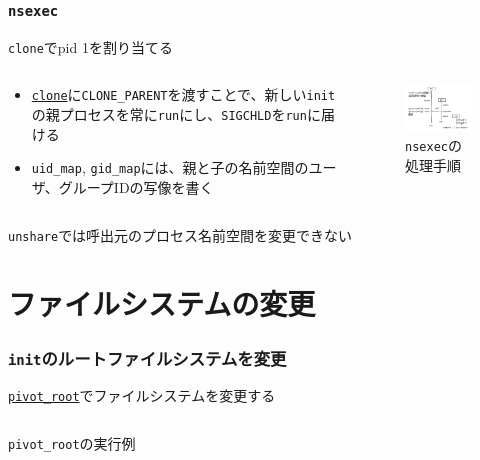 \documentclass[unicode, 14pt, aspectratio=169]{beamer}
\begin{document}
\begin{frame}[t]
  \frametitle{\texttt{nsexec}}
  \large
  \texttt{clone}でpid 1を割り当てる
  \normalsize
  \begin{columns}
    \begin{column}{0.5\textwidth}
      \begin{itemize}[leftmargin=0.8cm,label=$\circ$]
      \item \href{https://man7.org/linux/man-pages/man2/clone.2.html}{\texttt{clone}}に\texttt{CLONE\_PARENT}を渡すことで、新しい\texttt{init}の親プロセスを常に\texttt{run}にし、\texttt{SIGCHLD}を\texttt{run}に届ける
      \item \texttt{uid\_map}, \texttt{gid\_map}には、親と子の名前空間のユーザ、グループIDの写像を書く\supercite{usernamespaces}
      \end{itemize}
    \end{column}
    \begin{column}{0.5\textwidth}
      \begin{figure}
        \centering
        \includegraphics[width=5.5cm]{images/nsenter.drawio.pdf}
        \caption{\texttt{nsexec}の処理手順}
        \label{fig:nsenter}
      \end{figure}      
    \end{column}
  \end{columns}
  \texttt{unshare}では呼出元のプロセス名前空間を変更できない\supercite{unshare}
\end{frame} 
\section{ファイルシステムの変更}
\begin{frame}[t]
  \frametitle{\texttt{init}のルートファイルシステムを変更}
  \large
  \href{https://man7.org/linux/man-pages/man2/pivot_root.2.html}{\texttt{pivot\_root}}でファイルシステムを変更する
  \normalsize
  \begin{center}
    \inputminted{sh}{code/pivot_root.sh}
    \texttt{pivot\_root}の実行例
  \end{center}
\end{frame}
\end{document}
